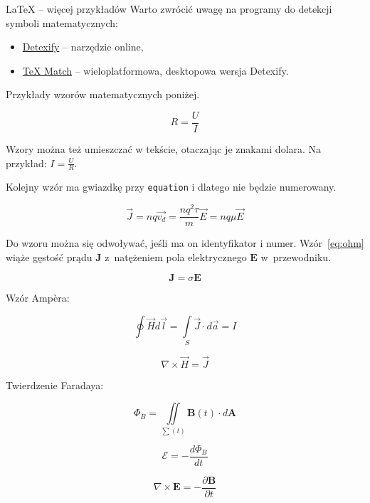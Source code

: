 \begin{easyappendix}{\LaTeX{} -- więcej przykładów}
Warto zwrócić uwagę na programy do detekcji symboli matematycznych:
\begin{itemize}
	\item \href{https://detexify.kirelabs.org/classify.html}{Detexify} -- narzędzie online,
	\item \href{https://github.com/zoeyfyi/TeX-Match}{TeX Match} -- wieloplatformowa, desktopowa wersja Detexify.
\end{itemize}

Przykłady wzorów matematycznych poniżej.

\begin{equation}
	R = \frac{U}{I}
\end{equation}

Wzory można też umieszczać w tekście, otaczając je znakami dolara. Na przykład: $I=\frac{U}{R}$.

Kolejny wzór ma gwiazdkę przy \texttt{equation} i dlatego nie będzie numerowany.

\begin{equation*}
	\vec{J} = nq \vec{v_d} =  \frac{nq^2 \tau}{m} \vec{E} = nq \mu \vec{E}    
\end{equation*}

Do wzoru można się odwoływać, jeśli ma on identyfikator i numer. Wzór~\ref{eq:ohm} wiąże gęstość prądu $\pmb{J}$ z~natężeniem pola elektrycznego $\pmb{E}$ w~przewodniku.

\begin{equation}
	\pmb{J} = \sigma \pmb{E}
	\label{eq:ohm}
\end{equation}


Wzór Ampèra:

\begin{equation}
	\oint \vec{H} d\vec{l} = \int\limits_{S} \vec{J} \cdot d \vec{a} = I
\end{equation}

\begin{equation}
	\nabla \times \vec{H} = \vec{J}
\end{equation}


Twierdzenie Faradaya:

\begin{equation*}
	\Phi_B = \iint\limits_{\sum (t)} \pmb{B}(t) \cdot d\pmb{A}
\end{equation*}

\begin{equation}
	\mathcal{E} = -\frac{d\Phi_B}{dt}
\end{equation}

\begin{equation}
	\nabla \times \pmb{E} = - \frac{\partial \pmb{B}}{\partial t}
\end{equation}


\end{easyappendix}
